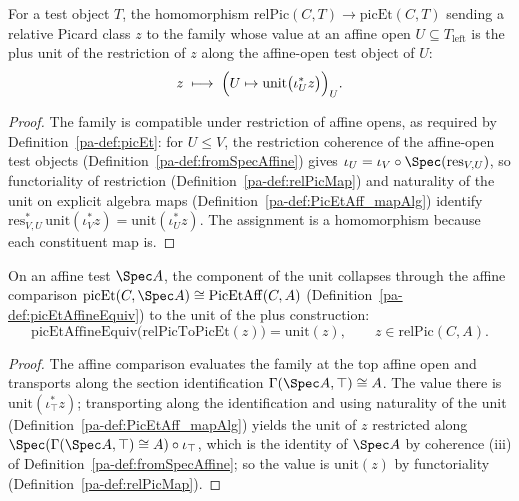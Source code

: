 \begin{definition}
  \label{pa-def:relPicToPicEt}
  \leanok

  For a test object \(T\), the homomorphism
  \(\mathrm{relPic}(C,T) \to \mathrm{picEt}(C,T)\) sending a relative Picard class \(z\) to
  the family whose value at an affine open \(U \subseteq T_{\mathrm{left}}\) is the plus unit
  of the restriction of \(z\) along the affine-open test object of \(U\):
  \[
    z \;\longmapsto\;
    \Bigl( U \mapsto \mathrm{unit}\bigl(\iota_U^{*} z\bigr) \Bigr)_{U} .
  \]
\end{definition}
\begin{proof}
  \leanok
  The family is compatible under restriction of affine opens, as required by
  Definition~\ref{pa-def:picEt}: for \(U \le V\), the restriction coherence of the affine-open
  test objects (Definition~\ref{pa-def:fromSpecAffine}) gives \(\iota_U = \iota_V \circ
  \Spec(\mathrm{res}_{V,U})\), so functoriality of restriction (Definition~\ref{pa-def:relPicMap})
  and naturality of the unit on explicit algebra maps (Definition~\ref{pa-def:PicEtAff_mapAlg})
  identify \(\mathrm{res}_{V,U}^{*}\,\mathrm{unit}(\iota_V^{*}z) =
  \mathrm{unit}(\iota_U^{*}z)\). The assignment is a homomorphism because each constituent
  map is.
\end{proof}

\begin{theorem}
  \label{pa-thm:picEtAffineEquiv_relPicToPicEt}
  \leanok

  On an affine test \(\Spec A\), the component of the unit collapses through the affine
  comparison \(\mathrm{picEt}(C, \Spec A) \cong \mathrm{PicEtAff}(C, A)\)
  (Definition~\ref{pa-def:picEtAffineEquiv}) to the unit of the plus construction:
  \[
    \mathrm{picEtAffineEquiv}\bigl(\mathrm{relPicToPicEt}(z)\bigr)
      = \mathrm{unit}(z), \qquad z \in \mathrm{relPic}(C,A).
  \]
\end{theorem}
\begin{proof}
  \leanok
  The affine comparison evaluates the family at the top affine open and transports along the
  section identification \(\Gamma(\Spec A, \top) \cong A\). The value there is
  \(\mathrm{unit}(\iota_\top^{*} z)\); transporting along the identification and using
  naturality of the unit (Definition~\ref{pa-def:PicEtAff_mapAlg}) yields the unit of
  \(z\) restricted along \(\Spec(\Gamma(\Spec A,\top) \cong A) \circ \iota_\top\), which is
  the identity of \(\Spec A\) by coherence (iii) of Definition~\ref{pa-def:fromSpecAffine}; so
  the value is \(\mathrm{unit}(z)\) by functoriality (Definition~\ref{pa-def:relPicMap}).
\end{proof}

